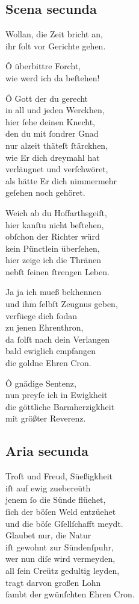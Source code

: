 \documentclass{ees}
\newenvironment{lyrics}[1]{%
  \subsection{#1}\nopagebreak%
  \begin{lyricslist}%
  \let\voice\item%
}{%
  \end{lyricslist}%
}
\begin{document}
\begin{lyrics}{Scena secunda}
  \voice[St: Michael]
  Wollan, die Zeit bricht an,\\
  ihr ſolt vor Gerichte gehen.

  \voice[St: Petrus]
  Ô überbittre Forcht,\\
  wie werd ich da beſtehen!

  \voice[Lucifer]
  Ô Gott der du gerecht\\
  in all und jeden Werckhen,\\
  hier ſehe deinen Knecht,\\
  den du mit ſondrer Gnad\\
  nur alzeit thäteſt ſtärckhen,\\
  wie Er dich dreymahl hat\\
  verläugnet und verſchwöret,\\
  als hätte Er dich nimmermehr\\
  geſehen noch gehöret.

  \voice[St: Michael]
  Weich ab du Hoffarthsgeiſt,\\
  hier kanſtu nicht beſtehen,\\
  obſchon der Richter würd\\
  kein Pünctlein überſehen,\\
  hier zeige ich die Thränen\\
  nebſt ſeinen ſtrengen Leben.

  \voice[Judex]
  Ja ja ich mueß bekhennen\\
  und ihm ſelbſt Zeugnus geben,\\
  verfüege dich ſodan\\
  zu jenen Ehrenthron,\\
  da ſolſt nach dein Verlangen\\
  bald ewiglich empfangen\\
  die goldne Ehren Cron.

  \voice[St: Petrus]
  Ô gnädige Sentenz,\\
  nun preyſe ich in Ewigkheit\\
  die göttliche Barmherzigkheit\\
  mit größter Reverenz.
\end{lyrics}

\begin{lyrics}{Aria secunda}
  \voice[St: Petrus]
  Troſt und Freud, Süeßigkheit\\
  iſt auf ewig zuebereüth\\
  jenem ſo die Sünde flüehet,\\
  ſich der böſen Weld entzüehet\\
  und die böſe Gſellſchafft meydt.\\[1ex]
  Glaubet nur, die Natur\\
  iſt gewohnt zur Sündenſpuhr,\\
  wer nun diſe wird vermeyden,\\
  all ſein Creütz gedultig leyden,\\
  tragt darvon großen Lohn\\
  ſambt der gwünſchten Ehren Cron.
\end{lyrics}
\end{document}
